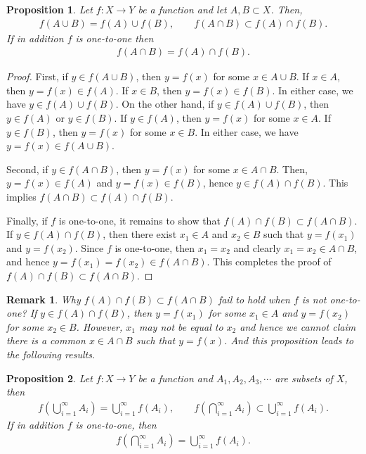\documentclass[11pt]{book}
\newtheorem{proposition}{Proposition}[chapter]
\newtheorem{remark}{Remark}[chapter]
\theoremstyle{definition}
\numberwithin{equation}{chapter}
\begin{document}
\medskip

\begin{proposition}
Let $f: X \to Y$ be a function and let $A, B \subset X$. Then,
\begin{align*}
    f(A \cup B) = f(A) \cup f(B), \qquad f(A \cap B) \subset f(A) \cap f(B).
\end{align*}
If in addition $f$ is one-to-one then
\begin{align*}
    f(A \cap B) = f(A) \cap f(B).
\end{align*}
\end{proposition}
\begin{proof}
First, if $y \in f(A \cup B)$, then $y = f(x)$ for some $x \in A \cup B$. If $x \in A$, then $y = f(x) \in f(A)$. If $x \in B$, then $y = f(x) \in f(B)$. In either case, we have $y \in f(A) \cup f(B)$. On the other hand, if $y \in f(A) \cup f(B)$, then $y \in f(A)$ or $y \in f(B)$. If $y \in f(A)$, then $y = f(x)$ for some $x \in A$. If $y \in f(B)$, then $y = f(x)$ for some $x \in B$. In either case, we have $y = f(x) \in f(A \cup B)$.

Second, if $y \in f(A \cap B)$, then $y = f(x)$ for some $x \in A \cap B$. Then, $y = f(x) \in f(A)$ and $y = f(x) \in f(B)$, hence $y \in f(A) \cap f(B)$. This implies $f(A \cap B) \subset f(A) \cap f(B)$.

Finally, if $f$ is one-to-one, it remains to show that $f(A) \cap f(B) \subset f(A \cap B)$. If $y \in f(A) \cap f(B)$, then there exist $x_1 \in A$ and $x_2 \in B$ such that $y = f(x_1)$ and $y = f(x_2)$. Since $f$ is one-to-one, then $x_1 = x_2$ and clearly $x_1 = x_2 \in A \cap B$, and hence $y = f(x_1) = f(x_2) \in f(A \cap B)$. This completes the proof of $f(A) \cap f(B) \subset f(A \cap B)$.
\end{proof}

\begin{remark}
Why $f(A) \cap f(B) \subset f(A \cap B)$ fail to hold when $f$ is not one-to-one? If $y \in f(A) \cap f(B)$, then $y = f(x_1)$ for some $x_1 \in A$ and $y = f(x_2)$ for some $x_2 \in B$. However, $x_1$ may not be equal to $x_2$ and hence we cannot claim there is a common $x \in A \cap B$ such that $y = f(x)$. And this proposition leads to the following results.
\end{remark}

\medskip

\begin{proposition}
Let $f: X \to Y$ be a function and $A_1, A_2, A_3, \cdots$ are subsets of $X$, then
\begin{align*}
    f \left(\bigcup^\infty_{i=1} A_i\right) = \bigcup^\infty_{i=1} f(A_i), \qquad f \left(\bigcap^\infty_{i=1} A_i\right) \subset \bigcup^\infty_{i=1} f(A_i).
\end{align*}
If in addition $f$ is one-to-one, then
\begin{align*}
    f \left(\bigcap^\infty_{i=1} A_i\right) = \bigcup^\infty_{i=1} f(A_i).
\end{align*}
\end{proposition}
\end{document}
